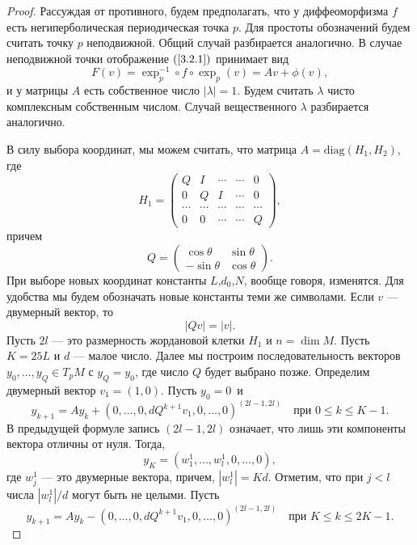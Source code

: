 \documentclass[12pt]{article}
\begin{document}
\begin{proof}
Рассуждая от противного, будем предполагать, что у диффеоморфизма $f$ есть негиперболическая периодическая точка $p$. Для простоты обозначений будем считать точку $p$ непод\-вижной. Общий случай разбирается аналогично. В случае непод\-вижной точки отображение $(\ref{3.2.1})$ принимает вид
$$F(v)=\exp_p^{-1}\circ f\circ\exp_p(v)=Av+\phi(v),$$
 и у матрицы $A$ есть собственное число $|\lambda|=1$. Будем считать $\lambda$ чисто комплексным собственным числом. Случай вещественного $\lambda$ разбирается аналогично.

В силу выбора координат, мы можем считать, что матрица $A=\mbox{diag}(H_1,H_2)$, где
$$H_1=\left(\begin{matrix}Q&I&\cdots&\cdots& 0\\
0&Q&I&\cdots& 0\\
\cdots&\cdots&\cdots&\cdots&\cdots\\
0&0& \cdots&\cdots&Q
\end{matrix}\right),$$
причем
$$Q=\left(\begin{matrix}\cos\theta&\sin\theta\\-\sin\theta&\cos\theta\end{matrix}\right).$$
При выборе новых координат константы $L$,$d_0$,$N$, вообще говоря, изменятся. Для удобства мы будем обозначать новые константы теми же символами.
Если $v$ --- двумерный вектор, то	
\begin{equation}
\label{3.4.1}
|Qv|=|v|.
\end{equation}
Пусть $2l$ --- это размерность жордановой клетки $H_1$ и $n=\dim M$. %
Пусть $K=25L$ и $d$ --- малое число. Далее мы построим последовательность векторов $y_0,\ldots,y_Q\in T_pM$ с $y_Q=y_0$, где число $Q$ будет выбрано позже. Определим двумерный вектор $v_1=(1,0)$. Пусть $y_0=0$~и
$$y_{k+1}=Ay_{k}+(0,\ldots,0,dQ^{k+1}v_1,0,\ldots,0)^{(2l-1,2l)}\quad\textrm{при }0\leq k\leq K-1.$$
В предыдущей формуле запись $(2l-1,2l)$ означает, что лишь эти компоненты вектора отличны от нуля.
Тогда, 
$$y_{K}=(w^1_1,\ldots,w^1_l,0,\ldots,0),$$
где $w^1_j$ --- это двумерные вектора, причем, $|w^1_l|=Kd$.  Отметим, что при $j<l$ числа $|w^1_l|/d$ могут быть не целыми. Пусть
$$y_{k+1}=Ay_{k}-(0,\ldots,0,dQ^{k+1}v_1,0,\ldots,0)^{(2l-1,2l)}\quad\textrm{при }K\leq k\leq2K-1.$$

\end{proof}
\end{document}
